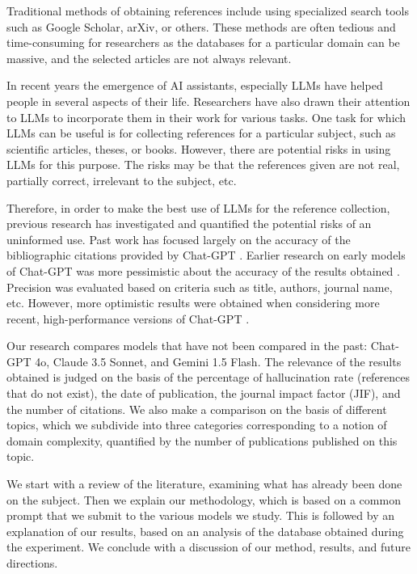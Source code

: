 \documentclass[runningheads]{llncs}
\begin{document}
Traditional methods of obtaining references include using specialized search tools such as Google Scholar, arXiv, or others.
These methods are often tedious and time-consuming for researchers as the databases for a particular domain can be massive, and the selected articles are not always relevant.

In recent years the emergence of AI assistants, especially LLMs have helped people in several aspects of their life. Researchers have also drawn their attention to LLMs to incorporate them in their work for various tasks. 
One task for which LLMs can be useful is for collecting references for a particular subject, such as scientific articles, theses, or books.
However, there are potential risks in using LLMs for this purpose. The risks may be that the references given are not real, partially correct, irrelevant to the subject, etc.

Therefore, in order to make the best use of LLMs for the reference collection, previous research has investigated and quantified the potential risks of an uninformed use.
Past work has focused largely on the accuracy of the bibliographic citations provided by Chat-GPT \cite{chatgpt2024}.
Earlier research on early models of Chat-GPT was more pessimistic about the accuracy of the results obtained \cite{day2023}. Precision was evaluated based on criteria such as title, authors, journal name, etc.
However, more optimistic results were obtained when considering more recent, high-performance versions of Chat-GPT \cite{byun-etal-2024-reference,walters_2023}.

Our research compares models that have not been compared in the past: Chat-GPT 4o, Claude 3.5 Sonnet, and Gemini 1.5 Flash. The relevance of the results obtained is judged on the basis of the percentage of hallucination rate (references that do not exist), the date of publication, the journal impact factor (JIF), and the number of citations.
 We also make a comparison on the basis of different topics, which we subdivide into three categories corresponding to a notion of domain complexity, quantified by the number of publications published on this topic.

We start with a review of the literature, examining what has already been done on the subject. Then we explain our methodology, which is based on a common prompt that we submit to the various models we study. This is followed by an explanation of our results, based on an analysis of the database obtained during the experiment. We conclude with a discussion of our method, results, and future directions.
\end{document}
